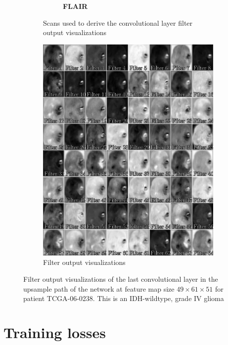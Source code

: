 \begin{subappendices}
\begin{figure}
\begin{subfigure}[b]{0.77\textwidth}
\begin{subfigure}[b]{0.24\textwidth}
        \caption*{\normalfont \textbf{\acrshort{FLAIR}}\nopunct}
        \end{subfigure}
        \caption{Scans used to derive the convolutional layer filter output visualizations}
    \end{subfigure}
    \begin{subfigure}[b]{0.77\textwidth}
        \centering
        \includegraphics[width=\textwidth]{Figures/conv_filter_HGG_deep.pdf}
        \caption{Filter output visualizations}\label{fig:prognosais_filter_hgg_deep_filter_only}
    \end{subfigure}
    \caption{Filter output visualizations of the last convolutional layer in the upsample path of the network at feature map size $49\times61\times51$ for patient TCGA-06-0238.
     This is an \acrshort{IDH}-wildtype, grade IV glioma}\label{fig:filter_hgg_deep}
\end{figure}


\newpage

\section{Training losses}\label{app:losses}


\end{subappendices}
